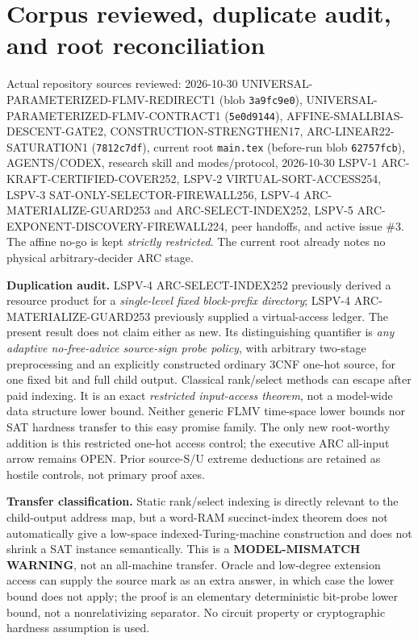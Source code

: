 \documentclass[10pt]{article}
\begin{document}
\section{Corpus reviewed, duplicate audit, and root reconciliation}
Actual repository sources reviewed: 2026-10-30 UNIVERSAL-PARAMETERIZED-FLMV-REDIRECT1 (blob \texttt{3a9fc9e0}), UNIVERSAL-PARAMETERIZED-FLMV-CONTRACT1 (\texttt{5e0d9144}), AFFINE-SMALLBIAS-DESCENT-GATE2, CONSTRUCTION-STRENGTHEN17, ARC-LINEAR22-SATURATION1 (\texttt{7812c7df}), current root \texttt{main.tex} (before-run blob \texttt{62757fcb}), AGENTS/CODEX, research skill and modes/protocol, 2026-10-30 LSPV-1 ARC-KRAFT-CERTIFIED-COVER252, LSPV-2 VIRTUAL-SORT-ACCESS254, LSPV-3 SAT-ONLY-SELECTOR-FIREWALL256, LSPV-4 ARC-MATERIALIZE-GUARD253 and ARC-SELECT-INDEX252, LSPV-5 ARC-EXPONENT-DISCOVERY-FIREWALL224, peer handoffs, and active issue \#3. The affine no-go is kept \emph{strictly restricted}. The current root already notes no physical arbitrary-decider ARC stage.

\textbf{Duplication audit.} LSPV-4 ARC-SELECT-INDEX252 previously derived a resource product for a \emph{single-level fixed block-prefix directory}; LSPV-4 ARC-MATERIALIZE-GUARD253 previously supplied a virtual-access ledger. The present result does not claim either as new. Its distinguishing quantifier is \emph{any adaptive no-free-advice source-sign probe policy}, with arbitrary two-stage preprocessing and an explicitly constructed ordinary 3CNF one-hot source, for one fixed bit and full child output. Classical rank/select methods can escape after paid indexing. It is an exact \emph{restricted input-access theorem}, not a model-wide data structure lower bound. Neither generic FLMV time-space lower bounds nor SAT hardness transfer to this easy promise family. The only new root-worthy addition is this restricted one-hot access control; the executive ARC all-input arrow remains OPEN. Prior source-S/U extreme deductions are retained as hostile controls, not primary proof axes.

\textbf{Transfer classification.} Static rank/select indexing is directly relevant to the child-output address map, but a word-RAM succinct-index theorem does not automatically give a low-space indexed-Turing-machine construction and does not shrink a SAT instance semantically. This is a \textbf{MODEL-MISMATCH WARNING}, not an all-machine transfer. Oracle and low-degree extension access can supply the source mark as an extra answer, in which case the lower bound does not apply; the proof is an elementary deterministic bit-probe lower bound, not a nonrelativizing separator. No circuit property or cryptographic hardness assumption is used.
\end{document}
